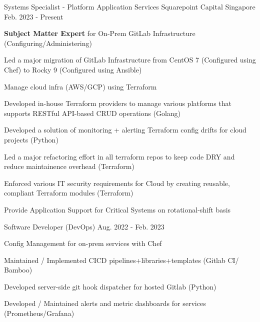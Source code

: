 

\begin{cventries}

  \cventry
    {Systems Specialist - Platform Application Services} %
    {Squarepoint Capital} %
    {Singapore} %
    {Feb. 2023 - Present} %
    {
      \begin{cvitems} %
        \item {\textbf{Subject Matter Expert} for On-Prem GitLab Infrastructure (Configuring/Administering)}
        \item {Led a major migration of GitLab Infrastructure from CentOS 7 (Configured using Chef) to Rocky 9 (Configured using Ansible)}
        \item {Manage cloud infra (AWS/GCP) using Terraform}
        \item {Developed in-house Terraform providers to manage various platforms that supports RESTful API-based CRUD operations (Golang)}
        \item {Developed a solution of monitoring + alerting Terraform config drifts for cloud projects (Python)}
        \item {Led a major refactoring effort in all terraform repos to keep code DRY and reduce maintainence overhead (Terraform)}
        \item {Enforced various IT security requirements for Cloud by creating reusable, compliant Terraform modules (Terraform)}
        \item {Provide Application Support for Critical Systems on rotational-shift basis}
      \end{cvitems}
    }

  \cventry
    {Software Developer (DevOps)} %
    {} %
    {} %
    {Aug. 2022 - Feb. 2023} %
    {
      \begin{cvitems} %
        \item {Config Management for on-prem services with Chef}
        \item {Maintained / Implemented CICD pipelines+libraries+templates (Gitlab CI/ Bamboo)}
        \item {Developed server-side git hook dispatcher for hosted Gitlab (Python)}
        \item {Developed / Maintained alerts and metric dashboards for services (Prometheus/Grafana)}
      \end{cvitems}
    }


\end{cventries}

